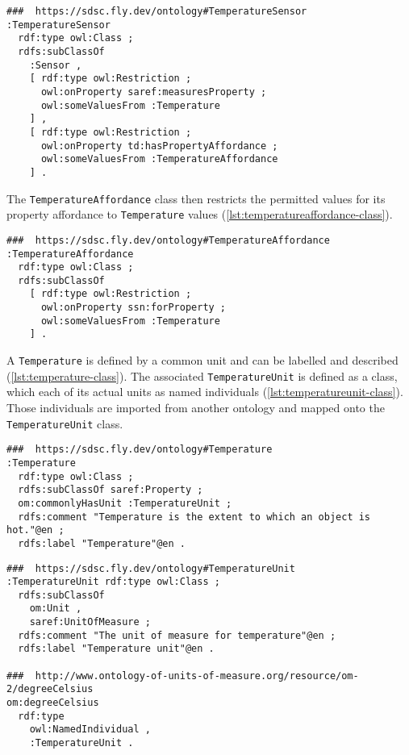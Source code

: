 \begin{lstlisting}[language=turtle,caption={{\ttfamily{}TemperatureSensor} class},label={lst:temperaturesensor-class}]
###  https://sdsc.fly.dev/ontology#TemperatureSensor
:TemperatureSensor
  rdf:type owl:Class ;
  rdfs:subClassOf
    :Sensor ,
    [ rdf:type owl:Restriction ;
      owl:onProperty saref:measuresProperty ;
      owl:someValuesFrom :Temperature
    ] ,
    [ rdf:type owl:Restriction ;
      owl:onProperty td:hasPropertyAffordance ;
      owl:someValuesFrom :TemperatureAffordance
    ] .
\end{lstlisting}

The \lstinline|TemperatureAffordance| class then restricts the permitted values for its property affordance to \lstinline|Temperature| values (\autoref{lst:temperatureaffordance-class}).

\begin{lstlisting}[language=turtle,caption={{\ttfamily{}TemperatureAffordance} class},label={lst:temperatureaffordance-class}]
###  https://sdsc.fly.dev/ontology#TemperatureAffordance
:TemperatureAffordance
  rdf:type owl:Class ;
  rdfs:subClassOf
    [ rdf:type owl:Restriction ;
      owl:onProperty ssn:forProperty ;
      owl:someValuesFrom :Temperature
    ] .
\end{lstlisting}

A \lstinline|Temperature| is defined by a common unit and can be labelled and described (\autoref{lst:temperature-class}). The associated \lstinline|TemperatureUnit| is defined as a class, which each of its actual units as named individuals (\autoref{lst:temperatureunit-class}). Those individuals are imported from another ontology and mapped onto the \lstinline|TemperatureUnit| class.

\begin{lstlisting}[language=turtle,caption={{\ttfamily{}Temperature} class},label={lst:temperature-class}]
###  https://sdsc.fly.dev/ontology#Temperature
:Temperature
  rdf:type owl:Class ;
  rdfs:subClassOf saref:Property ;
  om:commonlyHasUnit :TemperatureUnit ;
  rdfs:comment "Temperature is the extent to which an object is hot."@en ;
  rdfs:label "Temperature"@en .
\end{lstlisting}

\begin{lstlisting}[language=turtle,caption={{\ttfamily{}TemperatureUnit} class and its named individual(s)},label={lst:temperatureunit-class}]
###  https://sdsc.fly.dev/ontology#TemperatureUnit
:TemperatureUnit rdf:type owl:Class ;
  rdfs:subClassOf
    om:Unit ,
    saref:UnitOfMeasure ;
  rdfs:comment "The unit of measure for temperature"@en ;
  rdfs:label "Temperature unit"@en .

###  http://www.ontology-of-units-of-measure.org/resource/om-2/degreeCelsius
om:degreeCelsius
  rdf:type
    owl:NamedIndividual ,
    :TemperatureUnit .
\end{lstlisting}

